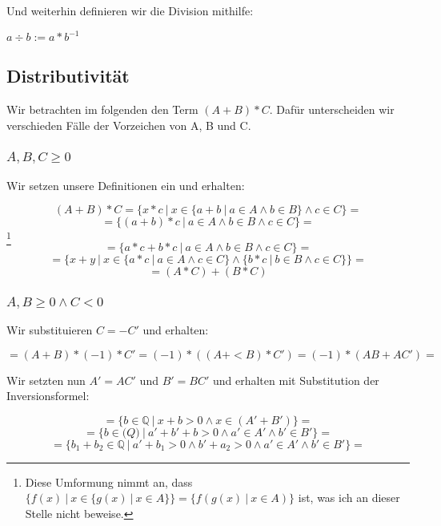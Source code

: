 \documentclass[12pt]{article}
\begin{document}
    Und weiterhin definieren wir die Division mithilfe:

    $a \div b := a * b^{-1}$

    \subsection{Distributivität}

    Wir betrachten im folgenden den Term $(A + B) * C$.
    Dafür unterscheiden wir verschieden Fälle der Vorzeichen von A, B und C.

    \subsubsection{$A, B, C \ge 0$}

    Wir setzen unsere Definitionen ein und erhalten:

    \[
        (A + B) * C = \{x * c \mspace{4mu} | \mspace{4mu} x \in \{a + b \mspace{4mu} | \mspace{4mu} a \in A \land b \in B\} \land c \in C\} =
    \]
    \[
        = \{(a + b) * c \mspace{4mu} | \mspace{4mu} a \in A \land b \in B \land c \in C\} =
    \]
    \footnote{
        Diese Umformung nimmt an, dass $\{f(x) \mspace{4mu} | \mspace{4mu} x \in \{g(x) \mspace{4mu} | \mspace{4mu} x \in A\}\} =
        \{f(g(x) \mspace{4mu} | \mspace{4mu} x \in A)\}$ ist,
        was ich an dieser Stelle nicht beweise.
    }
    \[
        = \{a * c + b * c \mspace{4mu} | \mspace{4mu} a \in A \land b \in B \land c \in C\} =
    \]
    \[
        = \{x + y \mspace{4mu} | \mspace{4mu} x \in \{a * c \mspace{4mu} | \mspace{4mu} a \in A \land c \in C\} \land
        \{b * c \mspace{4mu} | \mspace{4mu} b \in B \land c \in C\}\} =
    \]
    \[
        = (A * C) + (B * C)
    \]

    \subsubsection{$A, B \ge 0 \land C < 0$}

    Wir substituieren $C = -C'$ und erhalten:

    \[
        = (A + B) * (-1) * C' = (-1) * ((A +< B) * C') = (-1) * (AB + AC') =
    \]

    Wir setzten nun $A' = AC'$ und $B' = BC'$ und erhalten mit Substitution der Inversionsformel:

    \[
        = \{b \in \mathbb{Q} \mspace{4mu} | \mspace{4mu} x + b > 0 \land x \in (A' + B')\} =
    \]
    \[
        = \{b \in \mathbb(Q) \mspace{4mu} | \mspace{4mu} a' + b' + b > 0 \land a' \in A' \land b' \in B'\} =
    \]
    \[
        = \{b_1 + b_2 \in \mathbb{Q} \mspace{4mu} | \mspace{4mu} a' + b_1 > 0 \land b' + a_2 > 0 \land a' \in A' \land b' \in B'\} =
    \]
\end{document}
